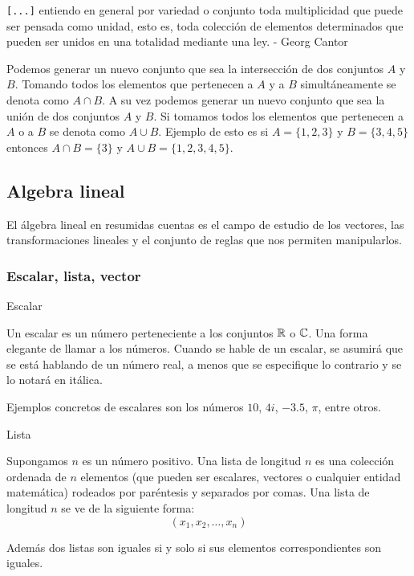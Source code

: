 \begin{note}
    \verb|[...]| entiendo en general por variedad o conjunto toda multiplicidad que puede ser pensada como unidad, esto es, toda colección de elementos determinados que pueden ser unidos en una totalidad mediante una ley. - Georg Cantor
\end{note}

Podemos generar un nuevo conjunto que sea la intersección de dos conjuntos $A$ y $B$. Tomando todos los elementos que pertenecen a $A$ y a $B$ simultáneamente se denota como $A \cap B$.
A su vez podemos generar un nuevo conjunto que sea la unión de dos conjuntos $A$ y $B$. Si tomamos todos los elementos que pertenecen a $A$ o a $B$ se denota como $A \cup B$.
Ejemplo de esto es si $A = \{1, 2, 3\}$ y $B = \{3, 4, 5\}$ entonces $A \cap B = \{3\}$ y $A \cup B = \{1, 2, 3, 4, 5\}$.

\subsection{Algebra lineal}

El álgebra lineal en resumidas cuentas es el campo de estudio de los vectores, las transformaciones lineales y el conjunto de reglas
que nos permiten manipularlos.

\subsubsection{Escalar, lista, vector}

\begin{definition}
    Escalar 

    Un escalar es un número perteneciente a los conjuntos $\mathbb{R}$  o $\mathbb{C}$. Una forma elegante
    de llamar a los números.
    Cuando se hable de un escalar, se asumirá que se está hablando de un número real, a menos que se 
    especifique lo contrario y se lo notará en itálica.
\end{definition}

Ejemplos concretos de escalares son los números $10$, $4i$, $-3.5$, $\pi$, entre otros.

\begin{definition}
    Lista 

    Supongamos $n$ es un número positivo. Una lista de longitud $n$ es una colección ordenada de $n$ elementos 
    (que pueden ser escalares, vectores o cualquier entidad matemática) rodeados por paréntesis y separados por comas.
    Una lista de longitud $n$ se ve de la siguiente forma:
    \begin{equation}
        (x_1, x_2, \ldots, x_n)
    \end{equation}

    Además dos listas son iguales si y solo si sus elementos correspondientes son iguales.
\end{definition}

